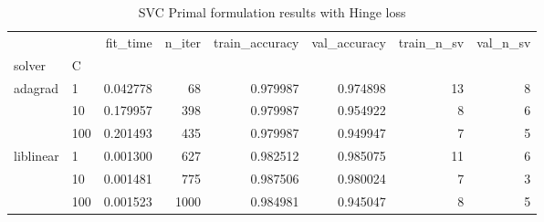 \begin{table}[h!]
\centering
\caption{SVC Primal formulation results with Hinge loss}
\label{primal_svc_hinge_cv_results}
\begin{tabular}{llrrrrrr}
\toprule
          &     &  fit\_time &  n\_iter &  train\_accuracy &  val\_accuracy &  train\_n\_sv &  val\_n\_sv \\
solver & C &           &         &                 &               &             &           \\
\midrule
adagrad & 1   &  0.042778 &      68 &        0.979987 &      0.974898 &          13 &         8 \\
          & 10  &  0.179957 &     398 &        0.979987 &      0.954922 &           8 &         6 \\
          & 100 &  0.201493 &     435 &        0.979987 &      0.949947 &           7 &         5 \\
liblinear & 1   &  0.001300 &     627 &        0.982512 &      0.985075 &          11 &         6 \\
          & 10  &  0.001481 &     775 &        0.987506 &      0.980024 &           7 &         3 \\
          & 100 &  0.001523 &    1000 &        0.984981 &      0.945047 &           8 &         5 \\
\bottomrule
\end{tabular}
\end{table}
